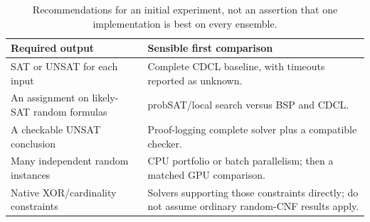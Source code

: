 \begin{table}[htbp]
\centering\small
\begin{tabularx}{\linewidth}{@{}L{.31\linewidth}Y@{}}
\toprule
Required output & Sensible first comparison \\
\midrule
SAT or UNSAT for each input & Complete CDCL baseline, with timeouts reported as unknown. \\
An assignment on likely-SAT random formulas & probSAT/local search versus BSP and CDCL. \\
A checkable UNSAT conclusion & Proof-logging complete solver plus a compatible checker. \\
Many independent random instances & CPU portfolio or batch parallelism; then a matched GPU comparison. \\
Native XOR/cardinality constraints & Solvers supporting those constraints directly; do not assume ordinary random-CNF results apply. \\
\bottomrule
\end{tabularx}
\caption{Recommendations for an initial experiment, not an assertion that
one implementation is best on every ensemble.}
\end{table}
